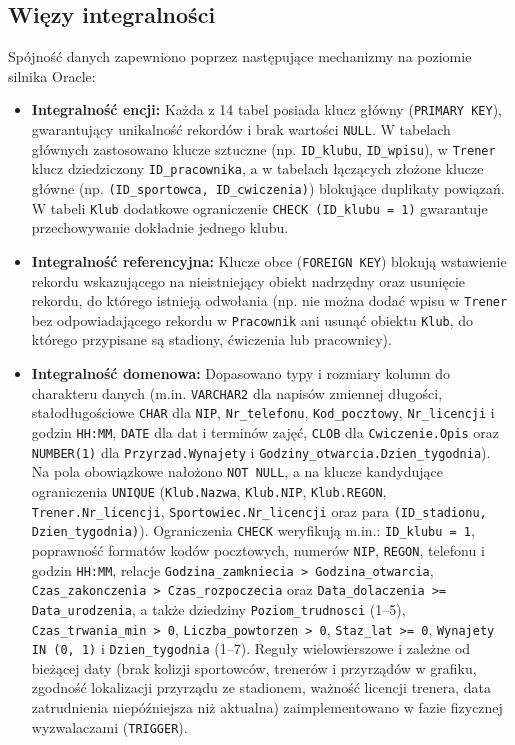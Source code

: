 \documentclass[11pt,a4paper]{article}
\begin{document}
\subsection{Więzy integralności}
Spójność danych zapewniono poprzez następujące mechanizmy na poziomie silnika Oracle:
\begin{itemize}
    \item \textbf{Integralność encji:} Każda z 14 tabel posiada klucz główny (\texttt{PRIMARY KEY}), gwarantujący unikalność rekordów i brak wartości \texttt{NULL}. W tabelach głównych zastosowano klucze sztuczne (np. \texttt{ID\_klubu}, \texttt{ID\_wpisu}), w \texttt{Trener} klucz dziedziczony \texttt{ID\_pracownika}, a w tabelach łączących złożone klucze główne (np. \texttt{(ID\_sportowca, ID\_cwiczenia)}) blokujące duplikaty powiązań. W tabeli \texttt{Klub} dodatkowe ograniczenie \texttt{CHECK (ID\_klubu = 1)} gwarantuje przechowywanie dokładnie jednego klubu.
    \item \textbf{Integralność referencyjna:} Klucze obce (\texttt{FOREIGN KEY}) blokują wstawienie rekordu wskazującego na nieistniejący obiekt nadrzędny oraz usunięcie rekordu, do którego istnieją odwołania (np. nie można dodać wpisu w \texttt{Trener} bez odpowiadającego rekordu w \texttt{Pracownik} ani usunąć obiektu \texttt{Klub}, do którego przypisane są stadiony, ćwiczenia lub pracownicy).
    \item \textbf{Integralność domenowa:} Dopasowano typy i rozmiary kolumn do charakteru danych (m.in. \texttt{VARCHAR2} dla napisów zmiennej długości, stałodługościowe \texttt{CHAR} dla \texttt{NIP}, \texttt{Nr\_telefonu}, \texttt{Kod\_pocztowy}, \texttt{Nr\_licencji} i godzin \texttt{HH:MM}, \texttt{DATE} dla dat i terminów zajęć, \texttt{CLOB} dla \texttt{Cwiczenie.Opis} oraz \texttt{NUMBER(1)} dla \texttt{Przyrzad.Wynajety} i \texttt{Godziny\_otwarcia.Dzien\_tygodnia}). Na pola obowiązkowe nałożono \texttt{NOT NULL}, a na klucze kandydujące ograniczenia \texttt{UNIQUE} (\texttt{Klub.Nazwa}, \texttt{Klub.NIP}, \texttt{Klub.REGON}, \texttt{Trener.Nr\_licencji}, \texttt{Sportowiec.Nr\_licencji} oraz para \texttt{(ID\_stadionu, Dzien\_tygodnia)}). Ograniczenia \texttt{CHECK} weryfikują m.in.: \texttt{ID\_klubu = 1}, poprawność formatów kodów pocztowych, numerów \texttt{NIP}, \texttt{REGON}, telefonu i godzin \texttt{HH:MM}, relacje \texttt{Godzina\_zamkniecia > Godzina\_otwarcia}, \texttt{Czas\_zakonczenia > Czas\_rozpoczecia} oraz \texttt{Data\_dolaczenia >= Data\_urodzenia}, a także dziedziny \texttt{Poziom\_trudnosci} (1--5), \texttt{Czas\_trwania\_min > 0}, \texttt{Liczba\_powtorzen > 0}, \texttt{Staz\_lat >= 0}, \texttt{Wynajety IN (0, 1)} i \texttt{Dzien\_tygodnia} (1--7). Reguły wielowierszowe i zależne od bieżącej daty (brak kolizji sportowców, trenerów i przyrządów w grafiku, zgodność lokalizacji przyrządu ze stadionem, ważność licencji trenera, data zatrudnienia niepóźniejsza niż aktualna) zaimplementowano w fazie fizycznej wyzwalaczami (\texttt{TRIGGER}).
\end{itemize}
\end{document}
